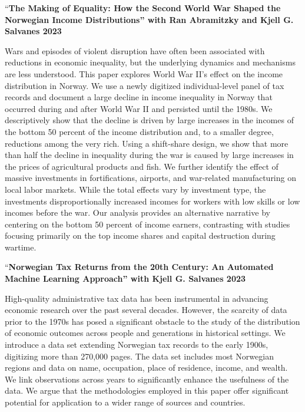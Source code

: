 \documentclass[11pt,]{article}
\begin{document}
``\textbf{The Making of Equality: How the Second World War Shaped the
Norwegian Income Distributions'' with Ran Abramitzky and Kjell G.
Salvanes \hfill 2023}

Wars and episodes of violent disruption have often been associated with
reductions in economic inequality, but the underlying dynamics and
mechanisms are less understood. This paper explores World War II's
effect on the income distribution in Norway. We use a newly digitized
individual-level panel of tax records and document a large decline in
income inequality in Norway that occurred during and after World War II
and persisted until the 1980s. We descriptively show that the decline is
driven by large increases in the incomes of the bottom 50 percent of the
income distribution and, to a smaller degree, reductions among the very
rich. Using a shift-share design, we show that more than half the
decline in inequality during the war is caused by large increases in the
prices of agricultural products and fish. We further identify the effect
of massive investments in fortifications, airports, and war-related
manufacturing on local labor markets. While the total effects vary by
investment type, the investments disproportionally increased incomes for
workers with low skills or low incomes before the war. Our analysis
provides an alternative narrative by centering on the bottom 50 percent
of income earners, contrasting with studies focusing primarily on the
top income shares and capital destruction during wartime.
\vspace{0.3cm}\vspace{-0.2cm}

``\textbf{Norwegian Tax Returns from the 20th Century: An Automated
Machine Learning Approach'' with Kjell G. Salvanes \hfill 2023}

High-quality administrative tax data has been instrumental in advancing
economic research over the past several decades. However, the scarcity
of data prior to the 1970s has posed a significant obstacle to the study
of the distribution of economic outcomes across people and generations
in historical settings. We introduce a data set extending Norwegian tax
records to the early 1900s, digitizing more than 270,000 pages. The data
set includes most Norwegian regions and data on name, occupation, place
of residence, income, and wealth. We link observations across years to
significantly enhance the usefulness of the data. We argue that the
methodologies employed in this paper offer significant potential for
application to a wider range of sources and countries.
\vspace{0.3cm}\vspace{-0.2cm}
\end{document}

